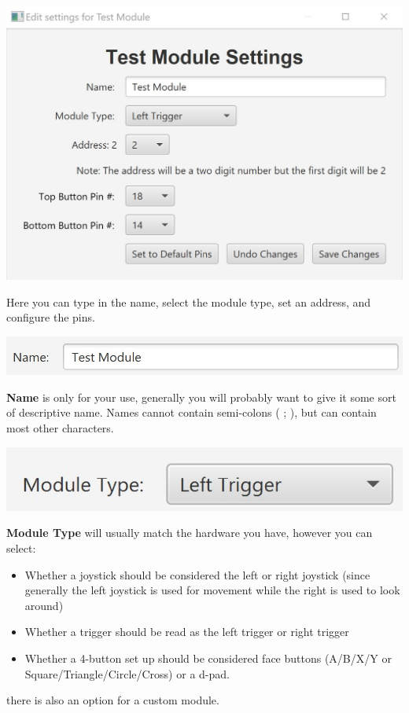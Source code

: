 \documentclass{article}
\begin{document}
\begin{center}
\includegraphics{ModuleSettings}
\end{center}

Here you can type in the name, select the module type, set an address, and configure the pins.

\begin{center}
\includegraphics{NameField}
\end{center}
\textbf{Name} is only for your use, generally you will probably want to give it some sort of descriptive name. Names cannot contain semi-colons ( ; ), but can contain most other characters.

\begin{center}
\includegraphics{ModTypeField}
\end{center}
\textbf{Module Type} will usually match the hardware you have, however you can select:
\begin{itemize}
  \item Whether a joystick should be considered the left or right joystick (since generally the left joystick is used for movement while the right is used to look around)
  \item Whether a trigger should be read as the left trigger or right trigger
  \item Whether a 4-button set up should be considered face buttons (A/B/X/Y or Square/Triangle/Circle/Cross) or a d-pad.
\end{itemize}
there is also an option for a custom module.
\end{document}
